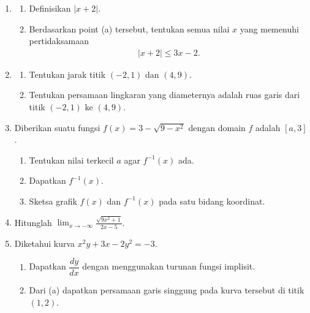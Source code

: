 \documentclass[10pt,openany,a4paper]{article}
\theoremstyle{definition}
\theoremstyle{definition}
\theoremstyle{plain}
\begin{document}
\newpage

\begin{enumerate}
    \item \begin{enumerate}
        \item Definisikan $|x+2|$.
        \item Berdasarkan point (a) tersebut, tentukan semua nilai $x$ yang memenuhi pertidaksamaan
        \begin{align*}
            |x+2|\leq 3x-2.
        \end{align*}
    \end{enumerate}

    \item \begin{enumerate}
        \item Tentukan jarak titik $(-2,1)$ dan $(4,9)$.
        \item Tentukan persamaan lingkaran yang diameternya adalah ruas garis dari titik $(-2,1)$ ke $(4,9)$.
    \end{enumerate}

    \item Diberikan suatu fungsi $f(x)=3-\sqrt{9-x^2}$ dengan domain $f$ adalah $[a,3]$.
    \begin{enumerate}
        \item Tentukan nilai terkecil $a$ agar $f^{-1}(x)$ ada.
        \item Dapatkan $f^{-1}(x)$.
        \item Sketsa grafik $f(x)$ dan $f^{-1}(x)$ pada satu bidang koordinat.
    \end{enumerate}

    \item Hitunglah $\displaystyle\lim_{x\to-\infty}\frac{\sqrt{9x^2+1}}{2x-5}$.

    \item Diketahui kurva $x^2y+3x-2y^2=-3$.
    \begin{enumerate}
        \item Dapatkan $\dfrac{dy}{dx}$ dengan menggunakan turunan fungsi implisit.
        \item Dari (a) dapatkan persamaan garis singgung pada kurva tersebut di titik $(1,2)$.
    \end{enumerate}
\end{enumerate}
\end{document}

